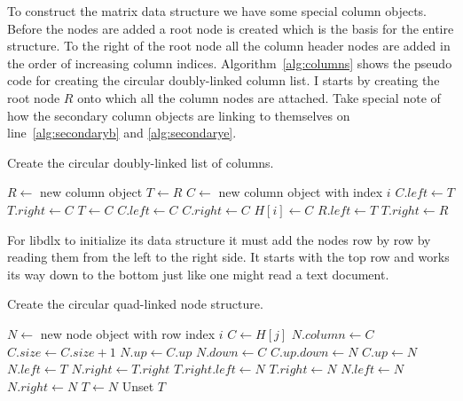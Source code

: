 To construct the matrix data structure we have some special column objects.
Before the nodes are added a root node is created which is the basis for the entire structure.
To the right of the root node all the column header nodes are added in the order of increasing column indices.
Algorithm~\ref{alg:columns} shows the pseudo code for creating the circular doubly-linked column list.
I starts by creating the root node $R$ onto which all the column nodes are attached.
Take special note of how the secondary column objects are linking to themselves on line~\ref{alg:secondaryb} and \ref{alg:secondarye}.

\begin{algorithm}[H]
	\caption{Create the circular doubly-linked list of columns.}
	\label{alg:columns}
	\begin{distribalgo}[1]
		\STATE $R \leftarrow$ new column object
		\STATE $T \leftarrow R$
			\STATE $C \leftarrow$ new column object with index $i$
				\STATE $C.left \leftarrow T$
				\STATE $T.right \leftarrow C$
				\STATE $T \leftarrow C$
			\ELSE
				\STATE $C.left \leftarrow C$  \label{alg:secondaryb}
				\STATE $C.right \leftarrow C$  \label{alg:secondarye}
			\ENDIF
			\STATE $H[i] \leftarrow C$
		\ENDFOR
		\STATE $R.left \leftarrow T$
		\STATE $T.right \leftarrow R$
	\end{distribalgo}
\end{algorithm}

For libdlx to initialize its data structure it must add the nodes row by row by reading them from the left to the right side.
It starts with the top row and works its way down to the bottom just like one might read a text document.

\begin{algorithm}[H]
	\caption{Create the circular quad-linked node structure.}
	\label{alg:nodes}
	\begin{distribalgo}[1]
				\STATE $N \leftarrow$ new node object with row index $i$
				\STATE $C \leftarrow H[j]$
				\STATE $N.column \leftarrow C$
				\STATE $C.size \leftarrow C.size + 1$
				\STATE $N.up \leftarrow C.up$
				\STATE $N.down \leftarrow C$
				\STATE $C.up.down \leftarrow N$
				\STATE $C.up \leftarrow N$
					\STATE $N.left \leftarrow T$
					\STATE $N.right \leftarrow T.right$
					\STATE $T.right.left \leftarrow N$
					\STATE $T.right \leftarrow N$
				\ELSE
					\STATE $N.left \leftarrow N$  
					\STATE $N.right \leftarrow N$
				\ENDIF
				\STATE $T \leftarrow N$
			\ENDFOR
			\STATE Unset $T$
		\ENDFOR
	\end{distribalgo}
\end{algorithm}







